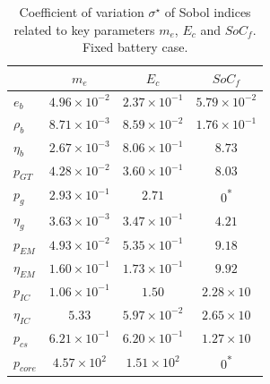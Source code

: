 \begin{table}[!h]
	\centering
	\begin{tabular}{l c c c}
		\cline{2-4} 
		&  $m_e$ & $E_c$ & $SoC_f$ \\
		\hline
		$e_b$ & $4.96\times10^{-2}$ & $2.37\times10^{-1}$ &  $5.79\times10^{-2}$ \\
		$\rho_b$ & $8.71\times10^{-3}$ &  $8.59\times10^{-2}$ & $1.76\times10^{-1}$ \\
		$\eta_b$ &  $2.67\times10^{-3}$ &  $8.06\times10^{-1}$  & $8.73$ \\
		
		$p_{GT}$ & $4.28\times10^{-2}$ & $3.60\times10^{-1}$ & $8.03$ \\
		$p_g$ & $2.93\times10^{-1}$ & $2.71$ & 0\textsuperscript{*} \\
		$\eta_g$ & $3.63\times10^{-3}$ & $3.47\times10^{-1}$ & $4.21$ \\
		
		$p_{EM}$ & $4.93\times10^{-2}$ & $5.35\times10^{-1}$ & $9.18$ \\
		$\eta_{EM}$ & $1.60\times10^{-1}$ & $1.73\times10^{-1}$ & $9.92$ \\
		
		$p_{IC}$ & $1.06\times10^{-1}$ & $1.50$ & $2.28\times10$ \\
		$\eta_{IC}$ & $5.33$ & $5.97\times10^{-2}$ & $2.65\times10$ \\
		
		$p_{cs}$ & $6.21\times10^{-1}$ & $6.20\times10^{-1}$ & $1.27\times10$ \\
		
		$p_{core}$ & $4.57\times10^{2}$ & $1.51\times10^{2}$ & 0\textsuperscript{*} \\	
		\hline
	\end{tabular}
	\caption{Coefficient of variation $\sigma^\star$ of Sobol indices related to key parameters $m_e$, $E_c$ and $SoC_f$. Fixed battery case.}
	\label{tab:techno_sens_fix_batt_coef_var}
\end{table} 

